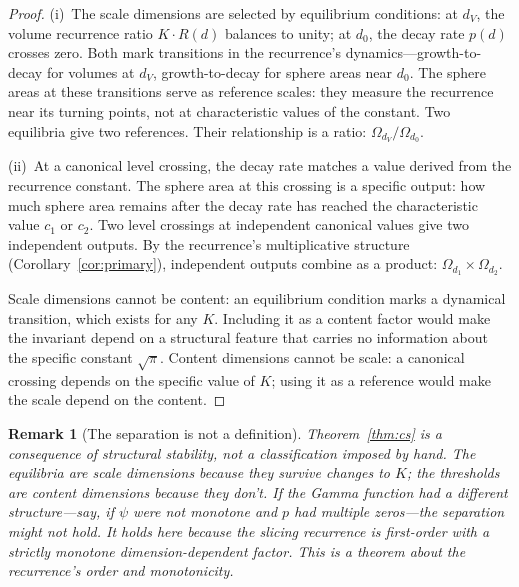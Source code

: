 \documentclass[11pt,a4paper]{article}
\newtheorem{remark}[theorem]{Remark}
\begin{document}
\begin{proof}
(i)~The scale dimensions are selected by equilibrium conditions: at $d_V$,
the volume recurrence ratio $K\cdot R(d)$ balances to unity; at $d_0$,
the decay rate $p(d)$ crosses zero. Both mark transitions in the
recurrence's dynamics---growth-to-decay for volumes at $d_V$,
growth-to-decay for sphere areas near $d_0$. The sphere areas at these
transitions serve as reference scales: they measure the recurrence near
its turning points, not at characteristic values of the constant.
Two equilibria give two references. Their relationship is a ratio:
$\Omega_{d_V}/\Omega_{d_0}$.

(ii)~At a canonical level crossing, the decay rate matches a value derived
from the recurrence constant. The sphere area at this crossing is a
specific output: how much sphere area remains after the decay rate has
reached the characteristic value $c_1$ or $c_2$. Two level crossings at
independent canonical values give two independent outputs. By the
recurrence's multiplicative structure
(Corollary~\ref{cor:primary}), independent outputs combine as a product:
$\Omega_{d_1}\times\Omega_{d_2}$.

Scale dimensions cannot be content: an equilibrium condition marks a
dynamical transition, which exists for any $K$. Including it as a
content factor would make the invariant depend on a structural feature
that carries no information about the specific constant $\sqrt{\pi}$.
Content dimensions cannot be scale: a canonical crossing depends on the
specific value of $K$; using it as a reference would make the scale
depend on the content.
\end{proof}

\begin{remark}[The separation is not a definition]
Theorem~\ref{thm:cs} is a consequence of structural stability, not a
classification imposed by hand. The equilibria are scale dimensions because
they survive changes to $K$; the thresholds are content dimensions because
they don't. If the Gamma function had a different structure---say, if
$\psi$ were not monotone and $p$ had multiple zeros---the separation might
not hold. It holds here because the slicing recurrence is first-order with
a strictly monotone dimension-dependent factor. This is a theorem about
the recurrence's order and monotonicity.
\end{remark}
\end{document}
